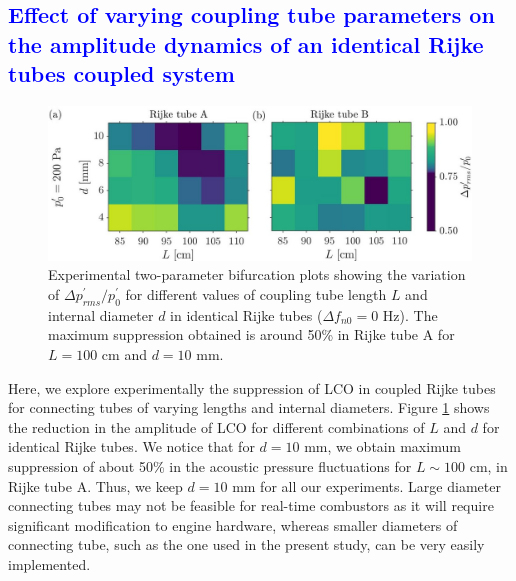\documentclass[%
 aps,
 amsmath,amssymb,
preprint,%
superscriptaddress,
]{revtex4-2}
\begin{document}
\newpage

\textcolor{blue}{\section{ Effect of varying coupling tube parameters on the amplitude dynamics of an identical Rijke tubes coupled system}}
\label{Supp_mat_3}

\begin{figure}[h!]
\centering
\includegraphics[scale=0.45]{d_vs_l_prms.jpg}
\caption{\label{d_vs_l}Experimental two-parameter bifurcation plots showing the variation of $\Delta p^\prime_{rms}/p^\prime_{0}$ for different values of coupling tube length $L$ and internal diameter $d$ in identical Rijke tubes ($\Delta f_{n0} = 0$ Hz). The maximum suppression obtained is around 50\% in Rijke tube A for $L =100$ cm and $d =10$ mm.} 
\end{figure}

Here, we explore experimentally the suppression of LCO in coupled Rijke tubes for connecting tubes of varying lengths and internal diameters. Figure \ref{d_vs_l} shows the reduction in the amplitude of LCO for different combinations of $L$ and $d$ for identical Rijke tubes. We notice that for $d=10$ mm, we obtain maximum suppression of about 50\% in the acoustic pressure fluctuations for $L \sim 100$ cm, in Rijke tube A. Thus, we keep $d=10$ mm for all our experiments. Large diameter connecting tubes may not be feasible for real-time combustors as it will require significant modification to engine hardware, whereas smaller diameters of connecting tube, such as the one used in the present study, can be very easily implemented.

\newpage

\end{document}
